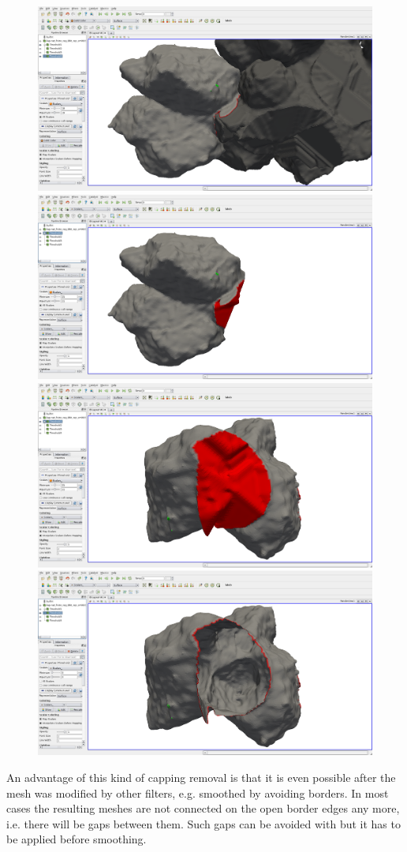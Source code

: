 \documentclass{InsightArticle}
\begin{document}
\begin{figure}[p]
\center
\includegraphics[width=.48\textwidth]{images/vtkDiscreteMarchingCubes_extension_03}
\hfill
\includegraphics[width=.48\textwidth]{images/vtkDiscreteMarchingCubes_extension_04}
\\[5mm]
\includegraphics[width=.48\textwidth]{images/vtkDiscreteMarchingCubes_extension_05}
\hfill
\includegraphics[width=.48\textwidth]{images/vtkDiscreteMarchingCubes_extension_06}
\label{fig:dmcCOt21t19}
\end{figure}


An advantage of this kind of capping removal is that it is even possible after the mesh was modified by other filters, e.g. smoothed by  avoiding borders. In most cases the resulting meshes are not connected on the open border edges any more, i.e. there will be gaps between them.
Such gaps can be avoided with \citep{Grothausmann2014_r} but it has to be applied before smoothing.
\end{document}
